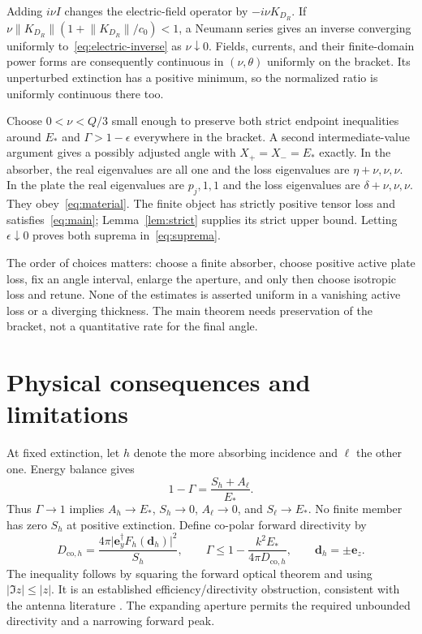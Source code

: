\documentclass[11pt]{article}
\newcommand{\ey}{\mathbf e_y}
\newcommand{\ez}{\mathbf e_z}
\newcommand{\norm}[1]{\lVert #1\rVert}
\newcommand{\abs}[1]{\lvert #1\rvert}
\begin{document}
Adding $i\nu I$ changes the electric-field operator by $-i\nu K_{D_R}$. If $\nu\norm{K_{D_R}}(1+\norm{K_{D_R}}/c_0)<1$, a Neumann series gives an inverse converging uniformly to~\eqref{eq:electric-inverse} as $\nu\downarrow0$. Fields, currents, and their finite-domain power forms are consequently continuous in $(\nu,\theta)$ uniformly on the bracket. Its unperturbed extinction has a positive minimum, so the normalized ratio is uniformly continuous there too.

Choose $0<\nu<Q/3$ small enough to preserve both strict endpoint inequalities around $E_*$ and $\Gamma>1-\epsilon$ everywhere in the bracket. A second intermediate-value argument gives a possibly adjusted angle with $X_+=X_-=E_*$ exactly. In the absorber, the real eigenvalues are all one and the loss eigenvalues are $\eta+\nu,\nu,\nu$. In the plate the real eigenvalues are $p_j,1,1$ and the loss eigenvalues are $\delta+\nu,\nu,\nu$. They obey~\eqref{eq:material}. The finite object has strictly positive tensor loss and satisfies~\eqref{eq:main}; Lemma~\ref{lem:strict} supplies its strict upper bound. Letting $\epsilon\downarrow0$ proves both suprema in~\eqref{eq:suprema}.

The order of choices matters: choose a finite absorber, choose positive active plate loss, fix an angle interval, enlarge the aperture, and only then choose isotropic loss and retune. None of the estimates is asserted uniform in a vanishing active loss or a diverging thickness. The main theorem needs preservation of the bracket, not a quantitative rate for the final angle.

\section{Physical consequences and limitations}\label{sec:consequences}
At fixed extinction, let $h$ denote the more absorbing incidence and $\ell$ the other one. Energy balance gives
\begin{equation}\label{eq:deficit}
 1-\Gamma=\frac{S_h+A_\ell}{E_*}.
\end{equation}
Thus $\Gamma\to1$ implies $A_h\to E_*$, $S_h\to0$, $A_\ell\to0$, and $S_\ell\to E_*$. No finite member has zero $S_h$ at positive extinction. Define co-polar forward directivity by
\begin{equation}\label{eq:directivity}
 D_{\mathrm{co},h}=\frac{4\pi\abs{\ey^\dagger F_h(\mathbf d_h)}^2}{S_h},\qquad
 \Gamma\leq1-\frac{k^2E_*}{4\pi D_{\mathrm{co},h}},\qquad\mathbf d_h=\pm\ez.
\end{equation}
The inequality follows by squaring the forward optical theorem and using $\abs{\Im z}\leq\abs z$. It is an established efficiency/directivity obstruction, consistent with the antenna literature \citep{AndersenFrandsen2005}. The expanding aperture permits the required unbounded directivity and a narrowing forward peak.
\end{document}
